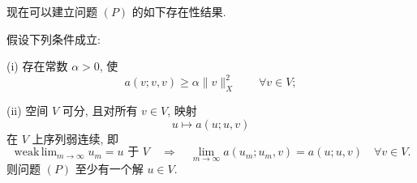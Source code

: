 现在可以建立问题 $(P)$ 的如下存在性结果.

\setcounter{statement}{1}
\begin{Theorem}\label{thm:navier-abstract-existence}
假设下列条件成立:

\textup{(i)} 存在常数 $\alpha>0$, 使
\begin{equation}\label{eq:navier-abstract-coercivity}
a(v;v,v)\geq\alpha\|v\|_X^2
\qquad\forall v\in V;
\end{equation}

\textup{(ii)} 空间 $V$ 可分, 且对所有 $v\in V$, 映射
\[
u\longmapsto a(u;u,v)
\]
在 $V$ 上序列弱连续, 即
\begin{equation}\label{eq:navier-abstract-weak-continuity}
\mathop{\mathrm{weak\,lim}}_{m\to\infty}u_m=u\text{ 于 }V
\quad\Longrightarrow\quad
\lim_{m\to\infty}a(u_m;u_m,v)=a(u;u,v)
\quad\forall v\in V.
\end{equation}
则问题 $(P)$ 至少有一个解 $u\in V$.
\end{Theorem}

